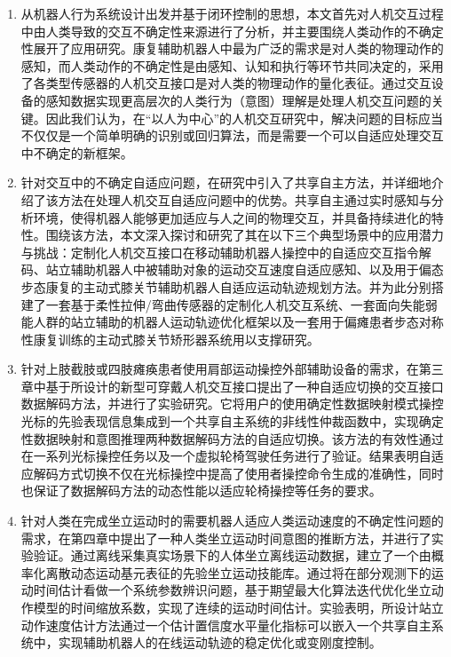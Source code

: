 \begin{enumerate}
\item 从机器人行为系统设计出发并基于闭环控制的思想，本文首先对人机交互过程中由人类导致的交互不确定性来源进行了分析，并主要围绕人类动作的不确定性展开了应用研究。康复辅助机器人中最为广泛的需求是对人类的物理动作的感知，而人类动作的不确定性是由感知、认知和执行等环节共同决定的，采用了各类型传感器的人机交互接口是对人类的物理动作的量化表征。通过交互设备的感知数据实现更高层次的人类行为（意图）理解是处理人机交互问题的关键。因此我们认为，在``以人为中心''的人机交互研究中，解决问题的目标应当不仅仅是一个简单明确的识别或回归算法，而是需要一个可以自适应处理交互中不确定的新框架。

\item 针对交互中的不确定自适应问题，在研究中引入了共享自主方法，并详细地介绍了该方法在处理人机交互自适应问题中的优势。共享自主通过实时感知与分析环境，使得机器人能够更加适应与人之间的物理交互，并具备持续进化的特性。围绕该方法，本文深入探讨和研究了其在以下三个典型场景中的应用潜力与挑战：定制化人机交互接口在移动辅助机器人操控中的自适应交互指令解码、站立辅助机器人中被辅助对象的运动交互速度自适应感知、以及用于偏态步态康复的主动式膝关节辅助机器人自适应运动轨迹规划方法。并为此分别搭建了一套基于柔性拉伸/弯曲传感器的定制化人机交互系统、一套面向失能弱能人群的站立辅助的机器人运动轨迹优化框架以及一套用于偏瘫患者步态对称性康复训练的主动式膝关节矫形器系统用以支撑研究。

\item 针对上肢截肢或四肢瘫痪患者使用肩部运动操控外部辅助设备的需求，在第三章中基于所设计的新型可穿戴人机交互接口提出了一种自适应切换的交互接口数据解码方法，并进行了实验研究。它将用户的使用确定性数据映射模式操控光标的先验表现信息集成到一个共享自主系统的非线性仲裁函数中，实现确定性数据映射和意图推理两种数据解码方法的自适应切换。该方法的有效性通过在一系列光标操控任务以及一个虚拟轮椅驾驶任务进行了验证。结果表明自适应解码方式切换不仅在光标操控中提高了使用者操控命令生成的准确性，同时也保证了数据解码方法的动态性能以适应轮椅操控等任务的要求。

\item 针对人类在完成坐立运动时的需要机器人适应人类运动速度的不确定性问题的需求，在第四章中提出了一种人类坐立运动时间意图的推断方法，并进行了实验验证。通过离线采集真实场景下的人体坐立离线运动数据，建立了一个由概率化离散动态运动基元表征的先验坐立运动技能库。通过将在部分观测下的运动时间估计看做一个系统参数辨识问题，基于期望最大化算法迭代优化坐立动作模型的时间缩放系数，实现了连续的运动时间估计。实验表明，所设计站立动作速度估计方法通过一个估计置信度水平量化指标可以嵌入一个共享自主系统中，实现辅助机器人的在线运动轨迹的稳定优化或变刚度控制。


\end{enumerate}
